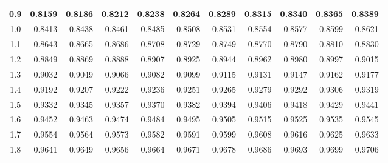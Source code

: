 \begin{table}[H]
\begin{center}
{\begin{tabular}{c | rrrrr | rrrrr |}
  0.9 & \normalsize{0.8159} & \normalsize{0.8186} & \normalsize{0.8212} & \normalsize{0.8238} & \normalsize{0.8264} & \normalsize{0.8289} & \normalsize{0.8315} & \normalsize{0.8340} & \normalsize{0.8365} & \normalsize{0.8389} \\
  \hline
  \hline
  1.0 & \normalsize{0.8413} & \normalsize{0.8438} & \normalsize{0.8461} & \normalsize{0.8485} & \normalsize{0.8508} & \normalsize{0.8531} & \normalsize{0.8554} & \normalsize{0.8577} & \normalsize{0.8599} & \normalsize{0.8621} \\
  1.1 & \normalsize{0.8643} & \normalsize{0.8665} & \normalsize{0.8686} & \normalsize{0.8708} & \normalsize{0.8729} & \normalsize{0.8749} & \normalsize{0.8770} & \normalsize{0.8790} & \normalsize{0.8810} & \normalsize{0.8830} \\
  1.2 & \normalsize{0.8849} & \normalsize{0.8869} & \normalsize{0.8888} & \normalsize{0.8907} & \normalsize{0.8925} & \normalsize{0.8944} & \normalsize{0.8962} & \normalsize{0.8980} & \normalsize{0.8997} & \normalsize{0.9015} \\
  1.3 & \normalsize{0.9032} & \normalsize{0.9049} & \normalsize{0.9066} & \normalsize{0.9082} & \normalsize{0.9099} & \normalsize{0.9115} & \normalsize{0.9131} & \normalsize{0.9147} & \normalsize{0.9162} & \normalsize{0.9177} \\
  1.4 & \normalsize{0.9192} & \normalsize{0.9207} & \normalsize{0.9222} & \normalsize{0.9236} & \normalsize{0.9251} & \normalsize{0.9265} & \normalsize{0.9279} & \normalsize{0.9292} & \normalsize{0.9306} & \normalsize{0.9319} \\
  \hline
  1.5 & \normalsize{0.9332} & \normalsize{0.9345} & \normalsize{0.9357} & \normalsize{0.9370} & \normalsize{0.9382} & \normalsize{0.9394} & \normalsize{0.9406} & \normalsize{0.9418} & \normalsize{0.9429} & \normalsize{0.9441} \\
  1.6 & \normalsize{0.9452} & \normalsize{0.9463} & \normalsize{0.9474} & \normalsize{0.9484} & \normalsize{0.9495} & \normalsize{0.9505} & \normalsize{0.9515} & \normalsize{0.9525} & \normalsize{0.9535} & \normalsize{0.9545} \\
  1.7 & \normalsize{0.9554} & \normalsize{0.9564} & \normalsize{0.9573} & \normalsize{0.9582} & \normalsize{0.9591} & \normalsize{0.9599} & \normalsize{0.9608} & \normalsize{0.9616} & \normalsize{0.9625} & \normalsize{0.9633} \\
  1.8 & \normalsize{0.9641} & \normalsize{0.9649} & \normalsize{0.9656} & \normalsize{0.9664} & \normalsize{0.9671} & \normalsize{0.9678} & \normalsize{0.9686} & \normalsize{0.9693} & \normalsize{0.9699} & \normalsize{0.9706} \\

\end{tabular}}
\end{center}
\end{table}
